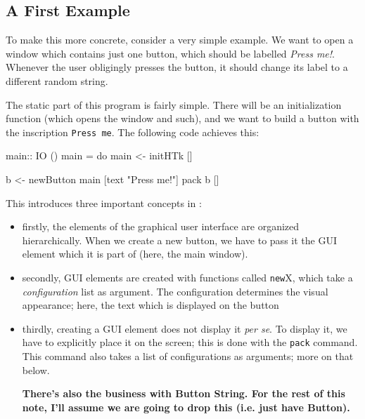 \subsection{A First Example}

To make this more concrete, consider a very simple example. We want to
open a window which contains just one button, which should be labelled
\textit{Press me!}. Whenever the user obligingly presses the button,
it should change its label to a different random string.

The static part of this program is fairly simple. There will be an
initialization function (which opens the window and such), and we want
to build a button with the inscription \texttt{Press me}. The
following code achieves this:

\begin{comment}
\begin{code}
module Main where

import HTk    
import Random
\end{code}
\end{comment}

\begin{code}  
main:: IO ()
main =
  do main <- initHTk []

     b <- newButton main [text "Press me!"] 
     pack b []
\end{code}
This introduces three important concepts in \HTk:
\begin{itemize}
\item firstly, the elements of the graphical user interface are
  organized hierarchically. When we create a new button, we have to
  pass it the GUI element which it is part of (here, the main window).
\item secondly, GUI elements are created with functions called
  \texttt{new}X, which take a \emph{configuration} list as
  argument. The configuration determines the visual appearance; here,
  the text which is displayed on the button
\item thirdly, creating a GUI element does not display it \textit{per
    se}. To display it, we have to explicitly place it on the screen;
  this is done with the \texttt{pack} command. This command also takes
  a list of configurations as arguments; more on that below.

\textbf{There's also the business with Button String. For the rest of
  this note, I'll assume we are going to drop this (i.e. just have Button).}
\end{itemize}

